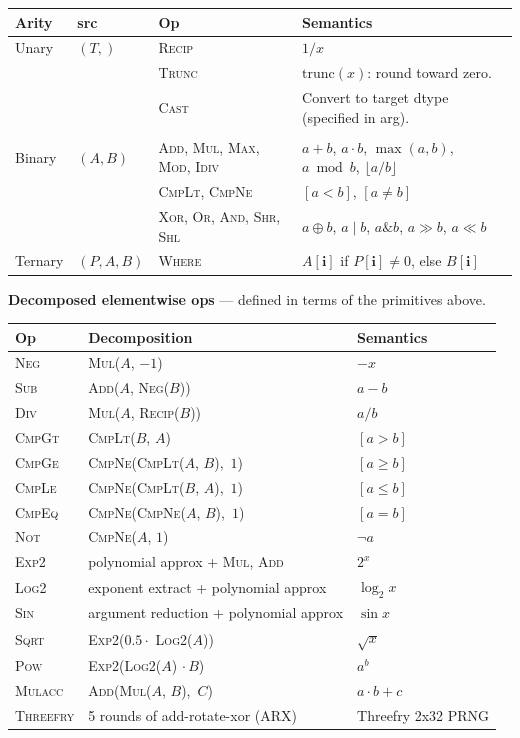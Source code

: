 \documentclass[10pt,letterpaper]{article}
\newcommand{\op}[1]{\textsc{#1}}
\begin{document}
\begin{tabular}{@{}l l l l@{}}
\toprule
\textbf{Arity} & \textbf{src} & \textbf{Op} & \textbf{Semantics} \\
\midrule
Unary & $(T,)$
  & \op{Recip}
  & $1/x$ \\
& & \op{Trunc}
  & $\mathrm{trunc}(x)$: round toward zero. \\
& & \op{Cast}
  & Convert to target dtype (specified in arg). \\
  \\[4pt]
Binary & $(A, B)$
  & \op{Add}, \op{Mul}, \op{Max}, \op{Mod}, \op{Idiv}
  & $a+b$, $a \cdot b$, $\max(a,b)$, $a \bmod b$, $\lfloor a/b \rfloor$ \\
& & \op{CmpLt}, \op{CmpNe}
  & $[a < b]$, $[a \ne b]$ \\
& & \op{Xor}, \op{Or}, \op{And}, \op{Shr}, \op{Shl}
  & $a \oplus b$, $a \mid b$, $a \mathbin{\&} b$, $a \gg b$, $a \ll b$ \\[4pt]
Ternary & $(P, A, B)$
  & \op{Where}
  & $A[\mathbf{i}]$ if $P[\mathbf{i}] \ne 0$, else $B[\mathbf{i}]$ \\

\bottomrule
\end{tabular}

\medskip
\textbf{Decomposed elementwise ops} --- defined in terms of the primitives above.

\smallskip
\begin{tabular}{@{}l l l@{}}
\toprule
\textbf{Op} & \textbf{Decomposition} & \textbf{Semantics} \\
\midrule
\op{Neg} & \op{Mul}($A$, $-1$) & $-x$ \\
\op{Sub} & \op{Add}($A$, \op{Neg}($B$)) & $a - b$ \\
\op{Div} & \op{Mul}($A$, \op{Recip}($B$)) & $a / b$ \\
\op{CmpGt} & \op{CmpLt}($B$, $A$) & $[a > b]$ \\
\op{CmpGe} & \op{CmpNe}(\op{CmpLt}($A$, $B$),\, $1$) & $[a \ge b]$ \\
\op{CmpLe} & \op{CmpNe}(\op{CmpLt}($B$, $A$),\, $1$) & $[a \le b]$ \\
\op{CmpEq} & \op{CmpNe}(\op{CmpNe}($A$, $B$),\, $1$) & $[a = b]$ \\
\op{Not} & \op{CmpNe}($A$, $1$) & $\lnot a$ \\[4pt]
\op{Exp2} & polynomial approx + \op{Mul}, \op{Add} & $2^x$ \\
\op{Log2} & exponent extract + polynomial approx & $\log_2 x$ \\
\op{Sin} & argument reduction + polynomial approx & $\sin x$ \\
\op{Sqrt} & \op{Exp2}($0.5 \cdot$ \op{Log2}($A$)) & $\sqrt{x}$ \\
\op{Pow} & \op{Exp2}(\op{Log2}($A$) $\cdot\, B$) & $a^b$ \\
\op{Mulacc} & \op{Add}(\op{Mul}($A$, $B$),\, $C$) & $a \cdot b + c$ \\
\op{Threefry} & 5 rounds of add-rotate-xor (ARX) & Threefry 2x32 PRNG \\
\bottomrule
\end{tabular}
\end{document}

